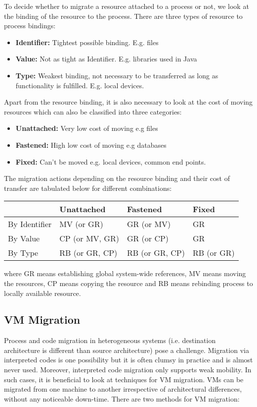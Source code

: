 \documentclass[twoside]{article}
\begin{document}
To decide whether to migrate a resource attached to a process or not, we look at the binding of the resource to the process. There are three types of resource to process bindings:
\begin{itemize}
    \item \textbf{Identifier:} Tightest possible binding. E.g. files 
    \item \textbf{Value:} Not as tight as Identifier. E.g. libraries used in Java
    \item \textbf{Type:} Weakest binding, not necessary to be transferred as long as functionality is fulfilled. E.g. local devices.
\end{itemize}

Apart from the resource binding, it is also necessary to look at the cost of moving resources which can also be classified into three categories:
\begin{itemize}
    \item \textbf{Unattached:} Very low cost of moving e.g files
    \item \textbf{Fastened:} High low cost of moving e.g databases
    \item \textbf{Fixed:} Can't be moved e.g. local devices, common end points.
\end{itemize}

The migration actions depending on the resource binding and their cost of transfer are tabulated below for different combinations:

\begin{table}[htb]
  \centering
\begin{tabular}{ |p{3.5cm}|p{3.5cm}|p{3.5cm}|p{3.5cm}| }
\hline
 & \textbf{Unattached} & \textbf{Fastened} & \textbf{Fixed} \\
\hline
By Identifier & MV (or GR) & GR (or MV) & GR \\ \hline
By Value & CP (or MV, GR) & GR (or CP) & GR \\ \hline
By Type & RB (or GR, CP) & RB (or GR, CP) & RB (or GR) \\ \hline
\end{tabular}
\end{table}

where GR means establishing global system-wide references, MV means moving the resources, CP means copying the resource and RB means rebinding process to locally available resource.

\subsection{VM Migration}
Process and code migration in heterogeneous systems (i.e. destination architecture is different than source architecture) pose a challenge. Migration via interpreted codes is one possibility but it is often clumsy in practice and is almost never used. Moreover, interpreted code migration only supports weak mobility. In such cases, it is beneficial to look at techniques for VM migration. VMs can be migrated from one machine to another irrespective of architectural differences, without any noticeable down-time. There are two methods for VM migration:
\end{document}
